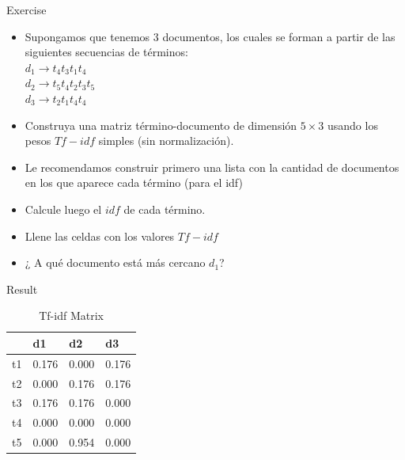 \documentclass[handout]{beamer}
\begin{document}
\begin{frame}{Exercise}
\begin{itemize}
 \item Supongamos que tenemos $3$ documentos, los cuales se forman a partir de las siguientes secuencias de términos: \\
 $d_{1}\rightarrow t_{4}t_{3}t_{1}t_{4}$ \\
 $d_{2}\rightarrow t_{5}t_{4}t_{2}t_{3}t_{5}$ \\
 $d_{3}\rightarrow t_{2}t_{1}t_{4}t_{4}$ \\

\item Construya una matriz término-documento de dimensión $5 \times 3$ usando los pesos $Tf-idf$ simples (sin normalización).
\item Le recomendamos construir primero una lista con la cantidad de documentos en los que aparece cada término (para el idf) 
\item Calcule luego  el $idf$ de cada término.
\item Llene las celdas con los valores $Tf-idf$
\item ¿ A qué documento está más cercano $d_{1}$?
\end{itemize}


\end{frame}

\begin{frame}{Result}
 \begin{table}[htbp]
\caption{Tf-idf Matrix}
\begin{tabular}{|l|r|r|r|}
\hline
 & \multicolumn{1}{l|}{d1} & \multicolumn{1}{l|}{d2} & \multicolumn{1}{l|}{d3} \\ \hline
t1 & 0.176 & 0.000 & 0.176 \\ \hline
t2 & 0.000 & 0.176 & 0.176 \\ \hline
t3 & 0.176 & 0.176 & 0.000 \\ \hline
t4 & 0.000 & 0.000 & 0.000 \\ \hline
t5 & 0.000 & 0.954 & 0.000 \\ \hline
\end{tabular}
\end{table}

\end{frame}
\end{document}
